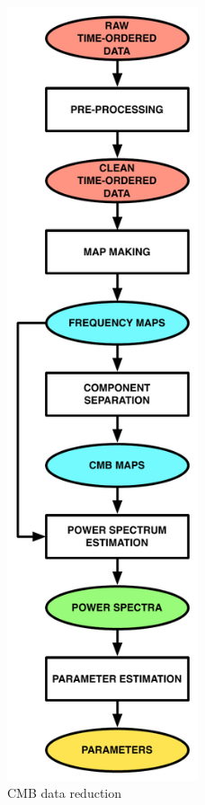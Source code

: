 \begin{figure}[htbp]
\begin{minipage}[h]{0.275\linewidth}
\includegraphics[width=0.5\textwidth]{Analysis/dr}
\caption{CMB data reduction}
\label{fig_dr}
\end{minipage}
\end{figure}

